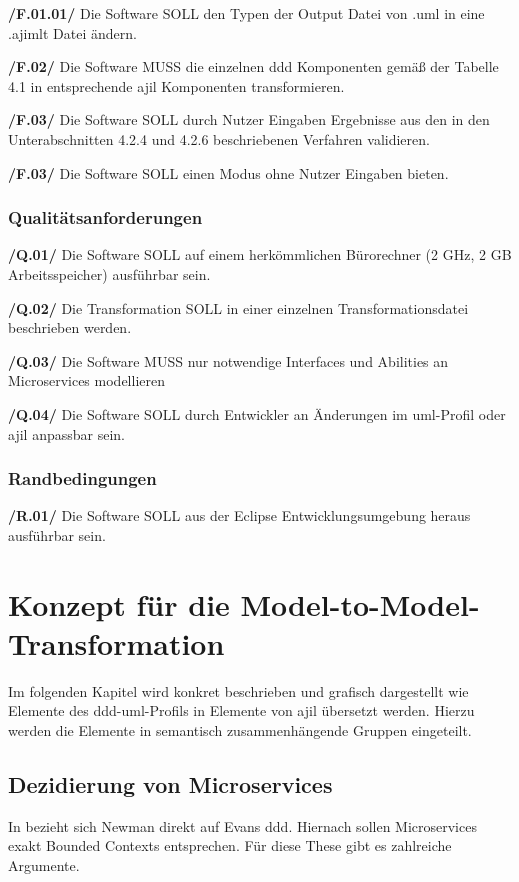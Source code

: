 \documentclass[
	oneside,  %
	ngerman, 
	final, 
	11pt, 
	a4paper, 
	1.1headlines, 
	headinclude=false, 
	footinclude=false, 
	mpinclude=false, 
	pagesize, 
	onecolumn, 
	titlepage, 
	parskip=half, 
	headsepline, 
	chapterprefix=false, 
	version=first, 
	listof=totoc, 
	bibliography=totoc, 
	toc=graduated, 
	fleqn
]{scrbook}
\begin{document}
\textbf{/F.01.01/} Die Software SOLL den Typen der Output Datei von .uml in eine .ajimlt Datei ändern.

\textbf{/F.02/} Die Software MUSS die einzelnen \ac{ddd} Komponenten gemäß der Tabelle 4.1 in entsprechende \ac{ajil} Komponenten transformieren.

\textbf{/F.03/} Die Software SOLL durch Nutzer Eingaben Ergebnisse aus den in den Unterabschnitten 4.2.4 und 4.2.6 beschriebenen Verfahren validieren.

\textbf{/F.03/} Die Software SOLL einen Modus ohne Nutzer Eingaben bieten.

\subsection{Qualitätsanforderungen}
\textbf{/Q.01/} Die Software SOLL auf einem herkömmlichen Bürorechner (2 GHz, 2 GB Arbeitsspeicher) ausführbar sein.

\textbf{/Q.02/} Die Transformation SOLL in einer einzelnen Transformationsdatei beschrieben werden.

\textbf{/Q.03/} Die Software MUSS nur notwendige Interfaces und Abilities an Microservices modellieren

\textbf{/Q.04/} Die Software SOLL durch Entwickler an Änderungen im \ac{uml}-Profil oder \ac{ajil} anpassbar sein.
\subsection{Randbedingungen}
\textbf{/R.01/} Die Software SOLL aus der Eclipse Entwicklungsumgebung heraus ausführbar sein.

\chapter{Konzept für die Model-to-Model-Transformation}
Im folgenden Kapitel wird konkret beschrieben und grafisch dargestellt wie Elemente des \ac{ddd}-\ac{uml}-Profils in Elemente von \ac{ajil} übersetzt werden. Hierzu werden die Elemente in semantisch zusammenhängende Gruppen eingeteilt.
\section{Dezidierung von Microservices}
In \cite{BuildingMicroServices} bezieht sich Newman direkt auf Evans \ac{ddd}. Hiernach sollen Microservices exakt Bounded Contexts entsprechen. Für diese These gibt es zahlreiche Argumente.
\end{document}
